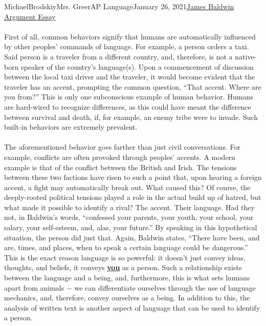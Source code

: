 \documentclass[12pt,letterpaper]{article}
\begin{document}
\begin{mla}{Michael}{Brodskiy}{Mrs. Greer}{AP Language}{January 26, 2021}{\underline{James Baldwin Argument Essay}}
    \paragraph{} \quad First of all, common behaviors signify that humans are automatically influenced by other peoples' commands of language. For example, a person orders a taxi. Said person is a traveler from a different country, and, therefore, is not a native-born speaker of the country's language(s). Upon a commencement of discussion between the local taxi driver and the traveler, it would become evident that the traveler has an accent, prompting the common question, ``That accent. Where are you from?'' This is only one subconscious example of human behavior. Humans are hard-wired to recognize differences, as this could have meant the difference between survival and death, if, for example, an enemy tribe were to invade. Such built-in behaviors are extremely prevalent. \\

    \paragraph{} \quad The aforementioned behavior goes farther than just civil conversations. For example, conflicts are often provoked through peoples' accents. A modern example is that of the conflict between the British and Irish. The tensions between these two factions have risen to such a point that, upon hearing a foreign accent, a fight may automatically break out. What caused this? Of course, the deeply-rooted political tensions played a role in the actual build up of hatred, but what made it possible to identify a rival? The accent. Their language. Had they not, in Baldwin's words, ``confessed your parents, your youth, your school, your salary, your self-esteem, and, alas, your future.'' By speaking in this hypothetical situation, the person did just that. Again, Baldwin states, ``There have been, and are, times, and places, when to speak a certain language could be dangerous.'' This is the exact reason language is so powerful: it doesn't just convey ideas, thoughts, and beliefs, it conveys \underline{\textbf{you}} as a person. Such a relationship exists between the language and a being, and, furthermore, this is what sets humans apart from animals $-$ we can differentiate ourselves through the use of language mechanics, and, therefore, convey ourselves as a being. In addition to this, the analysis of written text is another aspect of language that can be used to identify a person.\\


\end{mla}
\end{document}
